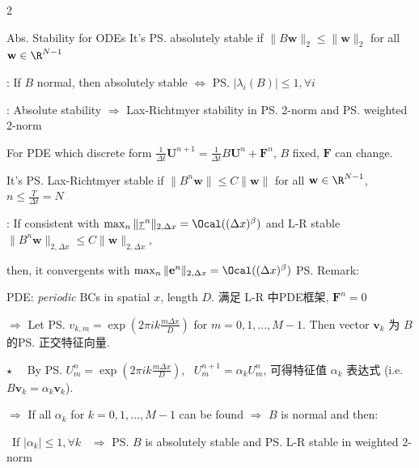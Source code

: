 \documentclass{note}
\begin{document}
\begin{multicols}{2}
{{\begin{MyTh}{Abs. Stability for ODEs}
        \quad It's \ps{absolutely stable} if \quad $\|B\mathbf{w}\|_2 \leq \|\mathbf{w}\|_2$ \quad for all $\mathbf{w}\in\R^{N-1}$
        
        \quad {}: If $B$ normal, then absolutely stable $\Leftrightarrow$ \ps{$|\lambda_i(B)|\leq1,\forall i$}

        \quad {}: Absolute stability $\Rightarrow$ Lax-Richtmyer stability in \ps{2-norm} and \ps{weighted 2-norm}
    \end{MyTh}

    \begin{MyTh}{}\tiny
        For PDE which discrete form $\frac{1}{\Delta t}\mathbf{U}^{n+1} = \frac{1}{\Delta t}B\mathbf{U}^n + \mathbf{F}^n$, $B$ fixed, $\mathbf{F}$ can change.

        \quad It's \ps{Lax-Richtmyer stable} if \quad $\|B^n\mathbf{w}\| \leq C\|\mathbf{w}\|$ \quad for all $\mathbf{w}\in\R^{N-1}$, $n\leq \frac{T}{\Delta t}=N$

        \quad {}: If consistent with $\max_{n}\|\underline{\tau}^n\|_{2,\Delta x}=\Ocal((\Delta x)^\beta)$ and L-R stable $\|B^n\mathbf{w}\|_{2,\Delta x} \leq C\|\mathbf{w}\|_{2,\Delta x}$,

        \quad then, it convergents with $\max_{n}\|\mathbf{e}^n\|_{2,\Delta x}=\Ocal((\Delta x)^\beta)$ \quad \ps{Remark}: 
    \end{MyTh}

    \begin{MyTh}{}\tiny
        PDE:  \textit{periodic} BCs in spatial $x$, length $D$.  满足 L-R 中PDE框架,  $\mathbf{F}^n=0$

        \quad $\Rightarrow$ Let \ps{$v_{k,m}=\exp(2\pi i k \frac{m\Delta x}{D})$} for $m=0,1,...,M-1$. \quad Then vector $\mathbf{v}_k$ 为 $B$ 的\ps{正交特征向量}.

        \quad $\star$ \ \ By \ps{$U^n_m = \exp(2\pi i k \frac{m\Delta x}{D})$, \ $U^{n+1}_m=\alpha_k U^n_m$}, 可得特征值 $\alpha_k$ 表达式 (i.e. $B\mathbf{v}_k=\alpha_k \mathbf{v}_k$).

        \quad $\Rightarrow$ If all $\alpha_k$ for $k=0,1,...,M-1$ can be found $\Rightarrow$ $B$ is normal and then:

        \qquad \ If $|\alpha_k|\leq 1,\forall k$ \ $\Rightarrow$ \ps{$B$ is absolutely stable} and \ps{L-R stable in weighted 2-norm}
        

\end{MyTh}}}
\end{multicols}
\end{document}
